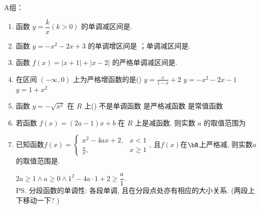 A组：
\begin{enumerate}
\item 函数 $y=\dfrac{k}{x}(k>0)$ 的单调减区间是.

\item 函数 $y=-x^2-2 x+3$ 的单调增区间是 ；单调减区间是.


\item 函数 $f(x)=|x+1|+|x-2|$ 的严格单调减区间是.

\item 在区间 $(-\infty, 0)$ 上为严格增函数的是\dotfill()
{$y=\frac{x}{1-x}+2$}
{$y=-x^2-2 x-1$}
{$y=1+x^2$}


\item 函数 $y=-\sqrt{x^2}$ 在 $R$ 上\dotfill()
{不是单调函数}
{是严格减函数}
{是常值函数}

\item 若函数 $f(x)=(2 a-1) x+b$ 在 $R$ 上是减函数, 则实数 $a$ 的取值范围为\blkda{$(-\infty,\frac{1}{2}]$}

\item 已知函数$f(x)=\begin{cases}
x^2-4ax+2, & x<1\\
\frac{a}{x}, & x\geq 1
\end{cases}$, 
且$f(x)$在$\bR$上严格减, 则实数$a$的取值范围是.
\begin{jieda}
$2a\geq 1\land a\geq0\land 1^2-4a\cdot 1+2\geq \dfrac{a}{1}$. \\
\ps 分段函数的单调性: 各段单调, 且在分段点处亦有相应的大小关系. (两段上下移动一下? )
\end{jieda}

    
\end{enumerate}


